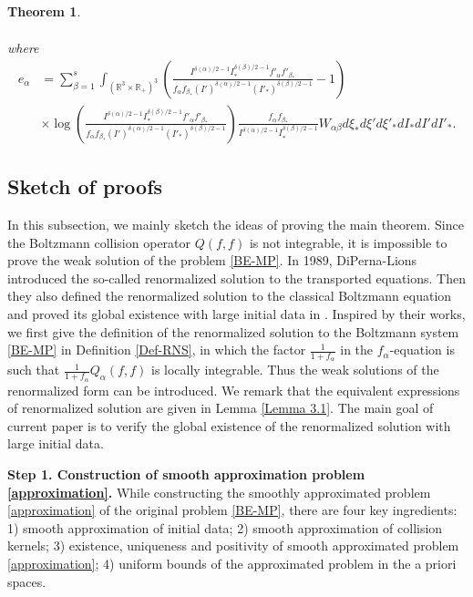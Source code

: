 \documentclass[reqno,11pt]{amsart}
\newtheorem{theorem}{Theorem}[section]
\numberwithin{equation}{section}
\def\R{\mathbb{R}}
\begin{document}
\begin{theorem}
\begin{enumerate}
{\begin{equation}
\begin{aligned}
	\end{aligned}
	\end{equation}
	where 
	\begin{equation}\label{ee}
		\begin{aligned}
			e_\alpha&=\sum \limits_{\beta =1}^s \int_{(\R^3\times \R_+)^3} (\tfrac{I^{\delta(\alpha)/2-1} I_* ^{\delta(\beta)/2-1}f'_\alpha f'_{\beta_*}  } {f_\alpha f_{\beta_* } (I')^{\delta(\alpha)/2-1} (I'_* )^{\delta(\beta)/2-1}} - 1)\\
			&\times \log (\tfrac{I^{\delta(\alpha)/2-1} I_* ^{\delta(\beta)/2-1} f'_\alpha f'_{\beta_*}}{f_\alpha f_{\beta_* } (I')^{\delta(\alpha)/2-1} (I'_* )^{\delta(\beta)/2-1} } ) \tfrac{f_\alpha f_{\beta_* } }{I^{\delta(\alpha)/2-1} I_* ^{\delta(\beta)/2-1} }W_{\alpha\beta }d\xi_* d\xi'd\xi'_* dI_* dI' dI'_*.
		\end{aligned}
	\end{equation}	}
\end{enumerate}
\end{theorem}

\subsection{Sketch of proofs}

In this subsection, we mainly sketch the ideas of proving the main theorem. Since the Boltzmann collision operator $Q (f,f)$ is not integrable, it is impossible to prove the weak solution of the problem \eqref{BE-MP}. In 1989, DiPerna-Lions \cite{DiPerna-Lions-Inv} introduced the so-called renormalized solution to the transported equations. Then they also defined the renormalized solution to the classical Boltzmann equation and proved its global existence with large initial data in \cite{Diperna-Lions}. Inspired by their works, we first give the definition of the renormalized solution to the Boltzmann system \eqref{BE-MP} in Definition \ref{Def-RNS}, in which the factor $\frac{1}{1 + f_\alpha}$ in the $f_\alpha$-equation is such that $ \frac{1}{1 + f_\alpha} Q_\alpha (f, f) $ is locally integrable. Thus the weak solutions of the renormalized form can be introduced. We remark that the equivalent expressions of renormalized solution are given in Lemma \ref{Lemma 3.1}. The main goal of current paper is to verify the global existence of the renormalized solution with large initial data.

{\bf Step 1. Construction of smooth approximation problem \eqref{approximation}.} While constructing the smoothly approximated problem \eqref{approximation} of the original problem \eqref{BE-MP}, there are four key ingredients: 1) smooth approximation of initial data; 2) smooth approximation of collision kernels; 3) existence, uniqueness and positivity of smooth approximated problem \eqref{approximation}; 4) uniform bounds of the approximated problem in the a priori spaces.
\end{document}
